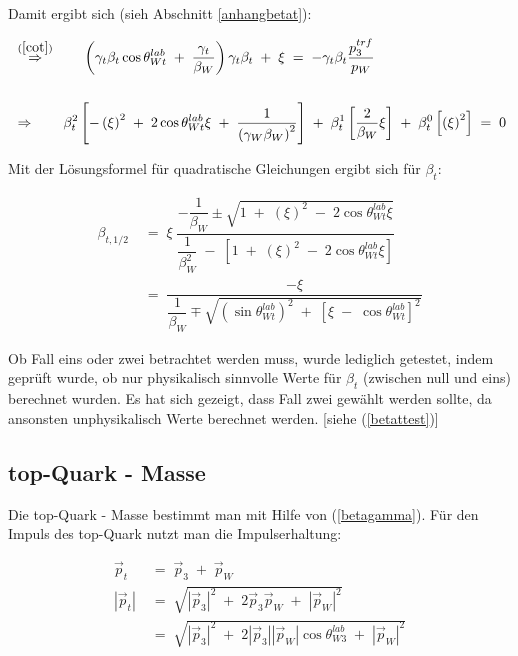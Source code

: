 \documentclass[
a4paper,                                %
twoside,                                %
BCOR1.4cm,                      %
ngerman,                                %
10pt,                           %
headings=normal,                %
headsepline,                    %
clearplainpage, %
final,                                  %
div=14,
parskip=full
]{scrbook}
\begin{document}
Damit ergibt sich (sieh Abschnitt \ref{anhangbetat}):

\begin{align}
&\stackrel{\mathrm{(\ref{cot})}}\Rightarrow\qquad
	\left(\gamma_{t} \beta_{t} \cos \theta_{Wt}^{lab}
	\;+\;\dfrac{\gamma_{t}}{\beta_{W}}\right)
	\gamma_{t} \beta_{t}\;+\;\xi
\;=\;
	-\gamma_{t} \beta_{t} \dfrac{p_{3}^{trf}}{p_{W}}
\nonumber
\\
\nonumber
\\
&\Rightarrow\qquad
	\beta_{t}^{2} \left[
		-\left(\xi\right)^{2}\;+\;2 \cos \theta_{Wt}^{lab} \xi
		\;+\;\dfrac{1}{\left(\gamma_{W} \beta_{W}\right)^{2}}
	\right]
	\;+\;\beta_{t}^{1} \left[\dfrac{2}{\beta_{W}} \xi \right]
	\;+\;\beta_{t}^{0} \left[\left(\xi\right)^{2} \right]
\;=\;0
\end{align}

Mit der L\"osungsformel f\"ur quadratische Gleichungen ergibt sich f\"ur 
$ \beta_{t} $:

\begin{align}
	\beta_{t, 1/2}
\;&=\;
	\xi\;
	\dfrac{-\dfrac{1}{\beta_{W}}\pm\sqrt{1\;+\;\left(\xi\right)^{2}
	\;-\;2 \cos \theta_{Wt}^{lab} \xi}}
	{\dfrac{1}{\beta_{W}^{2}}\;-\;\left[
	1\;+\;\left(\xi\right)^{2}\;-\;2 \cos \theta_{Wt}^{lab} \xi \right]}
\nonumber
\\
\;&=\;
	\dfrac{-\xi}{\dfrac{1}{\beta_{W}}\mp
	\sqrt{\left(\sin \theta_{Wt}^{lab}\right)^{2}
	\;+\;\left[\xi\;-\;\cos \theta_{Wt}^{lab}\right]^{2}}}
\label{betat}
\end{align}

Ob Fall eins oder zwei betrachtet werden muss, wurde lediglich getestet, indem gepr\"uft wurde, ob nur physikalisch sinnvolle Werte f\"ur $ \beta_{t} $ (zwischen null und eins) berechnet wurden. Es hat sich gezeigt, dass Fall zwei gew\"ahlt werden sollte, da ansonsten unphysikalisch Werte berechnet werden. [siehe (\ref{betattest})]

\subsection{top-Quark - Masse}

Die top-Quark - Masse bestimmt man mit Hilfe von (\ref{betagamma}). F\"ur den Impuls des top-Quark nutzt man die Impulserhaltung:

\begin{align}
	\vec{p}_{t}
\;&=\;
	\vec{p}_{3}\;+\;\vec{p}_{W}
\nonumber
\\
	|\vec{p}_{t}|
\;&=\;
	\sqrt{|\vec{p}_{3}|^{2}\;+\;2 \vec{p}_{3} \vec{p}_{W}\;+\;|\vec{p}_{W}|^{2}}
\nonumber
\\
\;&=\;
	\sqrt{|\vec{p}_{3}|^{2}
		\;+\;2 |\vec{p}_{3}| |\vec{p}_{W}| \cos \theta_{W3}^{lab}
		\;+\;|\vec{p}_{W}|^{2}}
\label{topimpuls}
\end{align}
\end{document}
